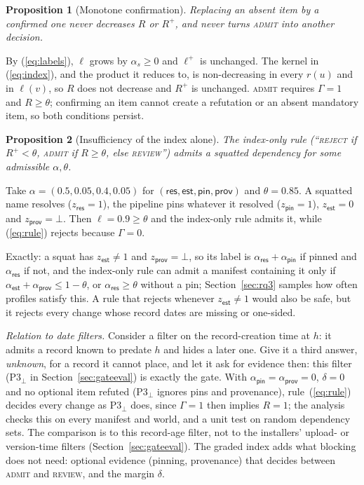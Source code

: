 \documentclass[conference]{IEEEtran}
\newcommand{\sres}{\mathsf{res}}
\newcommand{\sest}{\mathsf{est}}
\newcommand{\spin}{\mathsf{pin}}
\newcommand{\sprov}{\mathsf{prov}}
\newcommand{\dec}[1]{\textsc{#1}}
\newtheorem{proposition}{Proposition}
\begin{document}
\begin{proposition}[Monotone confirmation]
Replacing an absent item by a confirmed one never decreases $R$ or $R^{+}$, and never turns \dec{admit} into another
decision.
\end{proposition}
\begin{IEEEproof}
By (\ref{eq:labels}), $\ell$ grows by $\alpha_s\ge 0$ and $\ell^{+}$ is unchanged. The kernel in (\ref{eq:index}),
and the product it reduces to, is non-decreasing in every $r(u)$ and in $\ell(v)$, so $R$ does not decrease and $R^{+}$
is unchanged. \dec{admit} requires
$\Gamma=1$ and $R\ge\theta$; confirming an item cannot create a refutation or an absent mandatory item, so both conditions
persist.
\end{IEEEproof}

\begin{proposition}[Insufficiency of the index alone]
The index-only rule (``\dec{reject} if $R^{+}<\theta$, \dec{admit} if $R\ge\theta$, else \dec{review}'') admits a
squatted dependency for some admissible $\alpha,\theta$.
\end{proposition}
\begin{IEEEproof}
Take $\alpha=(0.5,0.05,0.4,0.05)$ for $(\sres,\sest,\spin,\sprov)$ and $\theta=0.85$. A squatted name resolves
($z_{\sres}=1$), the pipeline pins whatever it resolved ($z_{\spin}=1$), $z_{\sest}=0$ and $z_{\sprov}=\bot$. Then
$\ell=0.9\ge\theta$ and the index-only rule admits it, while (\ref{eq:rule}) rejects because $\Gamma=0$.
\end{IEEEproof}
Exactly: a squat has $z_{\sest}\neq 1$ and $z_{\sprov}=\bot$, so its label is $\alpha_{\sres}+\alpha_{\spin}$ if
pinned and $\alpha_{\sres}$ if not, and the index-only rule can admit a manifest containing it only if
$\alpha_{\sest}+\alpha_{\sprov}\le 1-\theta$, or $\alpha_{\sres}\ge\theta$ without a pin; Section~\ref{sec:rq3} samples
how often profiles satisfy this. A rule that rejects whenever $z_{\sest}\neq 1$ would also be safe, but it rejects
every change whose record dates are missing or one-sided.

\emph{Relation to date filters.} Consider a filter on the record-creation time at $h$: it admits a record known to
predate $h$ and hides a later one. Give it a third answer, \emph{unknown}, for a record it cannot place, and let it ask
for evidence then: this filter (P3$_\bot$ in Section~\ref{sec:gateeval}) is exactly the gate. With
$\alpha_{\spin}=\alpha_{\sprov}=0$, $\delta=0$ and no optional item refuted (P3$_\bot$ ignores pins and
provenance), rule~(\ref{eq:rule}) decides every change as P3$_\bot$ does, since $\Gamma=1$ then implies $R=1$; the
analysis checks this on every manifest and world, and a unit test on random dependency sets. The comparison is to
this record-age filter, not to the installers' upload- or version-time filters
(Section~\ref{sec:gateeval}). The graded index adds what blocking does not need: optional evidence (pinning,
provenance) that decides between \dec{admit} and \dec{review}, and the margin $\delta$.
\end{document}
